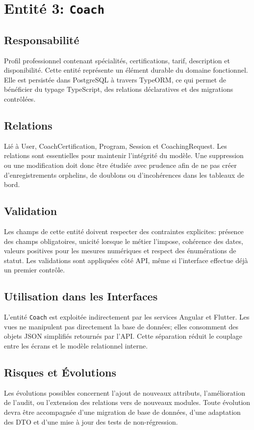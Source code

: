 \section{Entité 3: \texttt{Coach}}
\subsection{Responsabilité}
Profil professionnel contenant spécialités, certifications, tarif, description et disponibilité. Cette entité représente un élément durable du domaine fonctionnel. Elle est persistée dans PostgreSQL à travers TypeORM, ce qui permet de bénéficier du typage TypeScript, des relations déclaratives et des migrations contrôlées.

\subsection{Relations}
Lié à User, CoachCertification, Program, Session et CoachingRequest. Les relations sont essentielles pour maintenir l'intégrité du modèle. Une suppression ou une modification doit donc être étudiée avec prudence afin de ne pas créer d'enregistrements orphelins, de doublons ou d'incohérences dans les tableaux de bord.

\subsection{Validation}
Les champs de cette entité doivent respecter des contraintes explicites: présence des champs obligatoires, unicité lorsque le métier l'impose, cohérence des dates, valeurs positives pour les mesures numériques et respect des énumérations de statut. Les validations sont appliquées côté API, même si l'interface effectue déjà un premier contrôle.

\subsection{Utilisation dans les Interfaces}
L'entité \texttt{Coach} est exploitée indirectement par les services Angular et Flutter. Les vues ne manipulent pas directement la base de données; elles consomment des objets JSON simplifiés retournés par l'API. Cette séparation réduit le couplage entre les écrans et le modèle relationnel interne.

\subsection{Risques et Évolutions}
Les évolutions possibles concernent l'ajout de nouveaux attributs, l'amélioration de l'audit, ou l'extension des relations vers de nouveaux modules. Toute évolution devra être accompagnée d'une migration de base de données, d'une adaptation des DTO et d'une mise à jour des tests de non-régression.

